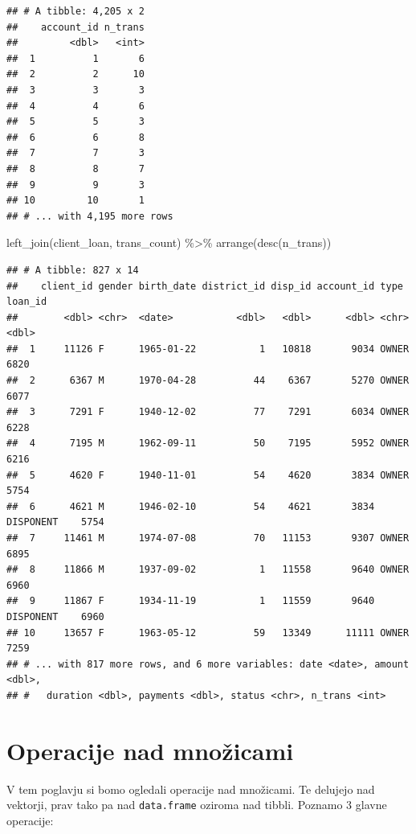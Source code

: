 \documentclass[
]{book}
\newenvironment{Shaded}{\begin{snugshade}}{\end{snugshade}}
\newcommand{\FunctionTok}[1]{\textcolor[rgb]{0.00,0.00,0.00}{#1}}
\newcommand{\NormalTok}[1]{#1}
\newcommand{\SpecialCharTok}[1]{\textcolor[rgb]{0.00,0.00,0.00}{#1}}
\begin{document}
\begin{verbatim}
## # A tibble: 4,205 x 2
##    account_id n_trans
##         <dbl>   <int>
##  1          1       6
##  2          2      10
##  3          3       3
##  4          4       6
##  5          5       3
##  6          6       8
##  7          7       3
##  8          8       7
##  9          9       3
## 10         10       1
## # ... with 4,195 more rows
\end{verbatim}

\begin{Shaded}
\begin{Highlighting}[]
\FunctionTok{left\_join}\NormalTok{(client\_loan, trans\_count) }\SpecialCharTok{\%\textgreater{}\%}
  \FunctionTok{arrange}\NormalTok{(}\FunctionTok{desc}\NormalTok{(n\_trans))}
\end{Highlighting}
\end{Shaded}

\begin{verbatim}
## # A tibble: 827 x 14
##    client_id gender birth_date district_id disp_id account_id type      loan_id
##        <dbl> <chr>  <date>           <dbl>   <dbl>      <dbl> <chr>       <dbl>
##  1     11126 F      1965-01-22           1   10818       9034 OWNER        6820
##  2      6367 M      1970-04-28          44    6367       5270 OWNER        6077
##  3      7291 F      1940-12-02          77    7291       6034 OWNER        6228
##  4      7195 M      1962-09-11          50    7195       5952 OWNER        6216
##  5      4620 F      1940-11-01          54    4620       3834 OWNER        5754
##  6      4621 M      1946-02-10          54    4621       3834 DISPONENT    5754
##  7     11461 M      1974-07-08          70   11153       9307 OWNER        6895
##  8     11866 M      1937-09-02           1   11558       9640 OWNER        6960
##  9     11867 F      1934-11-19           1   11559       9640 DISPONENT    6960
## 10     13657 F      1963-05-12          59   13349      11111 OWNER        7259
## # ... with 817 more rows, and 6 more variables: date <date>, amount <dbl>,
## #   duration <dbl>, payments <dbl>, status <chr>, n_trans <int>
\end{verbatim}

\hypertarget{operacije-nad-mnoux17eicami}{%
\section{Operacije nad množicami}\label{operacije-nad-mnoux17eicami}}

V tem poglavju si bomo ogledali operacije nad množicami. Te delujejo nad vektorji, prav tako pa nad \texttt{data.frame} oziroma nad tibbli. Poznamo 3 glavne operacije:
\end{document}
